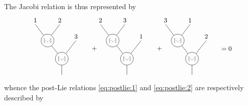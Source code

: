 \documentclass[10pt]{article}
\theoremstyle{definition}
\begin{document}
The Jacobi relation is thus represented by 
\[
\small
\begin{tikzpicture}[scale=1]

\node[circle,draw,inner sep=2pt] (b1) at (0,0) {$\scriptstyle[\cdot,\cdot]$};
\draw (b1)--(0,-0.8);

\node[circle,draw,inner sep=2pt] (a1) at (-0.7,0.9) {$\scriptstyle[\cdot,\cdot]$};
\draw (a1)--(b1);
\draw (-1.3,1.7)--(a1);
\draw (-0.1,1.7)--(a1);

\draw (0.7,0.9)--(b1);

\node at (-1.3,1.9) {$1$};
\node at (-0.1,1.9) {$2$};
\node at (0.7,1.1) {$3$};

\node at (1.6,0.5) {$+$};

\begin{scope}[shift={(3.2,0)}]

\node[circle,draw,inner sep=2pt] (b2) at (0,0) {$\scriptstyle[\cdot,\cdot]$};
\draw (b2)--(0,-0.8);

\node[circle,draw,inner sep=2pt] (a2) at (-0.7,0.9) {$\scriptstyle[\cdot,\cdot]$};
\draw (a2)--(b2);
\draw (-1.3,1.7)--(a2);
\draw (-0.1,1.7)--(a2);

\draw (0.7,0.9)--(b2);

\node at (-1.3,1.9) {$2$};
\node at (-0.1,1.9) {$3$};
\node at (0.7,1.1) {$1$};

\end{scope}

\node at (4.8,0.5) {$+$};

\begin{scope}[shift={(6.4,0)}]

\node[circle,draw,inner sep=2pt] (b3) at (0,0) {$\scriptstyle[\cdot,\cdot]$};
\draw (b3)--(0,-0.8);

\node[circle,draw,inner sep=2pt] (a3) at (-0.7,0.9) {$\scriptstyle[\cdot,\cdot]$};
\draw (a3)--(b3);
\draw (-1.3,1.7)--(a3);
\draw (-0.1,1.7)--(a3);

\draw (0.7,0.9)--(b3);

\node at (-1.3,1.9) {$3$};
\node at (-0.1,1.9) {$1$};
\node at (0.7,1.1) {$2$};

\end{scope}

\node at (8.1,0.5) {$=0$};

\end{tikzpicture}
\]
whence the post-Lie relations \eqref{eq:postlie:1} and \eqref{eq:postlie:2} are respectively described by
\end{document}

